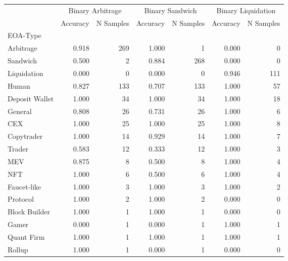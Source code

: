 \begin{tabular}{l|rr|rr|rr}
\toprule
{} & \multicolumn{2}{c|}{Binary Arbitrage} & \multicolumn{2}{c|}{Binary Sandwich} & \multicolumn{2}{c}{Binary Liquidation} \\
{} &         Accuracy & N Samples &        Accuracy & N Samples &           Accuracy & N Samples \\
EOA-Type       &                  &           &                 &           &                    &           \\
\midrule
Arbitrage      &            0.918 &       269 &           1.000 &         1 &              0.000 &         0 \\
Sandwich       &            0.500 &         2 &           0.884 &       268 &              0.000 &         0 \\
Liquidation    &            0.000 &         0 &           0.000 &         0 &              0.946 &       111 \\
Human          &            0.827 &       133 &           0.707 &       133 &              1.000 &        57 \\
Deposit Wallet &            1.000 &        34 &           1.000 &        34 &              1.000 &        18 \\
General        &            0.808 &        26 &           0.731 &        26 &              1.000 &         6 \\
CEX            &            1.000 &        25 &           1.000 &        25 &              1.000 &         8 \\
Copytrader     &            1.000 &        14 &           0.929 &        14 &              1.000 &         7 \\
Trader         &            0.583 &        12 &           0.333 &        12 &              1.000 &         3 \\
MEV            &            0.875 &         8 &           0.500 &         8 &              1.000 &         4 \\
NFT            &            1.000 &         6 &           0.500 &         6 &              1.000 &         4 \\
Faucet-like    &            1.000 &         3 &           1.000 &         3 &              1.000 &         2 \\
Protocol       &            1.000 &         2 &           1.000 &         2 &              0.000 &         0 \\
Block Builder  &            1.000 &         1 &           1.000 &         1 &              0.000 &         0 \\
Gamer          &            0.000 &         1 &           0.000 &         1 &              1.000 &         1 \\
Quant Firm     &            1.000 &         1 &           1.000 &         1 &              1.000 &         1 \\
Rollup         &            1.000 &         1 &           0.000 &         1 &              0.000 &         0 \\
\bottomrule
\end{tabular}
